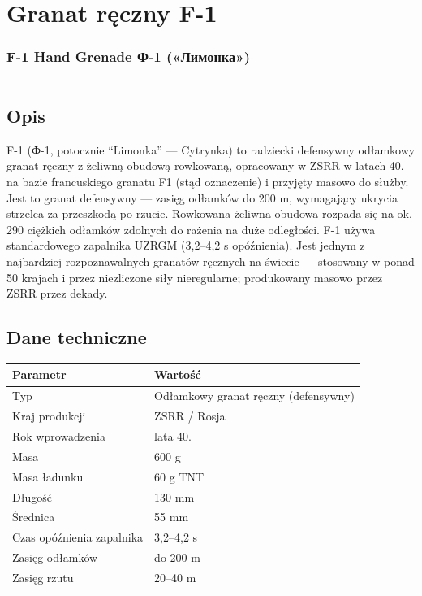 \documentclass[12pt,openany,oneside]{book}
\begin{document}
\chapter{Granat ręczny F-1}\label{granat-rux119czny-f-1}

\subsection{F-1 Hand Grenade \textbar{} Ф-1
(«Лимонка»)}\label{f-1-hand-grenade-ux444-1-ux43bux438ux43cux43eux43dux43aux430}

\begin{center}\rule{0.5\linewidth}{0.5pt}\end{center}

\section{Opis}\label{opis-101}

F-1 (Ф-1, potocznie ``Limonka'' --- Cytrynka) to radziecki defensywny
odłamkowy granat ręczny z żeliwną obudową rowkowaną, opracowany w ZSRR w
latach 40. na bazie francuskiego granatu F1 (stąd oznaczenie) i przyjęty
masowo do służby. Jest to granat defensywny --- zasięg odłamków do 200
m, wymagający ukrycia strzelca za przeszkodą po rzucie. Rowkowana
żeliwna obudowa rozpada się na ok. 290 ciężkich odłamków zdolnych do
rażenia na duże odległości. F-1 używa standardowego zapalnika UZRGM
(3,2--4,2 s opóźnienia). Jest jednym z najbardziej rozpoznawalnych
granatów ręcznych na świecie --- stosowany w ponad 50 krajach i przez
niezliczone siły nieregularne; produkowany masowo przez ZSRR przez
dekady.

\section{Dane techniczne}\label{dane-techniczne-101}

\begin{longtable}[]{@{}ll@{}}
\toprule\noalign{}
Parametr & Wartość \\
\midrule\noalign{}
\endhead
\bottomrule\noalign{}
\endlastfoot
Typ & Odłamkowy granat ręczny (defensywny) \\
Kraj produkcji & ZSRR / Rosja \\
Rok wprowadzenia & lata 40. \\
Masa & 600 g \\
Masa ładunku & 60 g TNT \\
Długość & 130 mm \\
Średnica & 55 mm \\
Czas opóźnienia zapalnika & 3,2--4,2 s \\
Zasięg odłamków & do 200 m \\
Zasięg rzutu & 20--40 m \\
\end{longtable}
\end{document}
